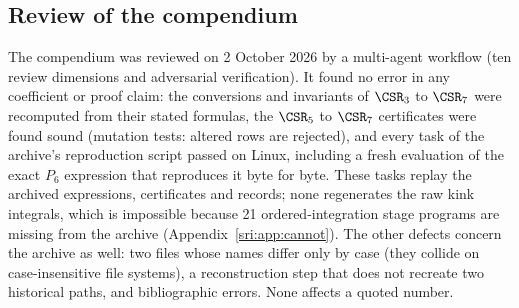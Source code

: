 \subsection{Review of the compendium}\label{sri:sec:review1}
The compendium was reviewed on 2 October 2026 by a multi-agent workflow (ten review dimensions and adversarial
verification). It found no error in any coefficient or proof claim: the conversions and invariants of $\CSR_3$ to
$\CSR_7$ were recomputed from their stated formulas, the $\CSR_5$ to $\CSR_7$ certificates were found sound (mutation
tests: altered rows are rejected), and every task of the archive's reproduction script passed on Linux, including a
fresh evaluation of the exact $P_6$ expression that reproduces it byte for byte. These tasks replay the archived
expressions, certificates and records; none regenerates the raw kink integrals, which is impossible because 21
ordered-integration stage programs are missing from the archive (Appendix~\ref{sri:app:cannot}). The other defects concern
the archive as well: two files whose names differ only by case (they collide on case-insensitive file systems), a
reconstruction step that does not recreate two historical paths, and bibliographic errors. None affects a quoted
number.

